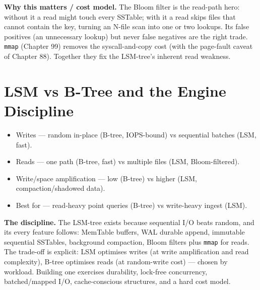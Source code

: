 \textbf{Why this matters / cost model.} The Bloom filter is the read-path hero: without it a read might touch every SSTable; with it a read skips files that cannot contain the key, turning an N-file scan into one or two lookups. Its false positives (an unnecessary lookup) but never false negatives are the right trade. \texttt{mmap} (Chapter 99) removes the syscall-and-copy cost (with the page-fault caveat of Chapter 88). Together they fix the LSM-tree's inherent read weakness.

\section{LSM vs B-Tree and the Engine Discipline}
\begin{itemize}
\item Writes --- random in-place (B-tree, IOPS-bound) vs sequential batches (LSM, fast).
\item Reads --- one path (B-tree, fast) vs multiple files (LSM, Bloom-filtered).
\item Write/space amplification --- low (B-tree) vs higher (LSM, compaction/shadowed data).
\item Best for --- read-heavy point queries (B-tree) vs write-heavy ingest (LSM).
\end{itemize}

\textbf{The discipline.} The LSM-tree exists because sequential I/O beats random, and its every feature follows: MemTable buffers, WAL durable append, immutable sequential SSTables, background compaction, Bloom filters plus \texttt{mmap} for reads. The trade-off is explicit: LSM optimises writes (at write amplification and read complexity), B-tree optimises reads (at random-write cost) --- chosen by workload. Building one exercises durability, lock-free concurrency, batched/mapped I/O, cache-conscious structures, and a hard cost model.

